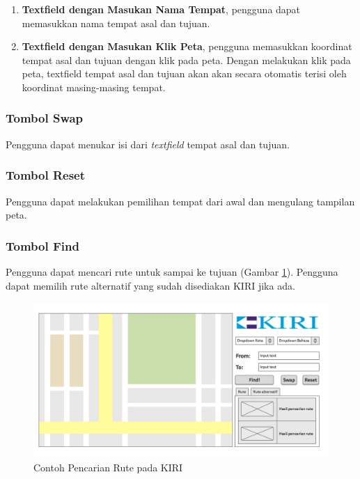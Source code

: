 \begin{enumerate}
	\item \textbf{Textfield dengan Masukan Nama Tempat}, pengguna dapat memasukkan nama tempat asal dan tujuan.
	
	\item \textbf{Textfield dengan Masukan Klik Peta}, pengguna memasukkan koordinat tempat asal dan tujuan dengan klik pada peta. Dengan melakukan klik pada peta, textfield tempat asal dan tujuan akan akan secara otomatis terisi oleh koordinat masing-masing tempat.
	

\end{enumerate}

\subsubsection{Tombol Swap}
Pengguna dapat menukar isi dari \textit{textfield} tempat asal dan tujuan. 

\subsubsection{Tombol Reset}
Pengguna dapat melakukan pemilihan tempat dari awal dan mengulang tampilan peta. 

\subsubsection{Tombol Find}
Pengguna dapat mencari rute untuk sampai ke tujuan (Gambar \ref{fig:4_KIRI_find}). Pengguna dapat memilih rute alternatif yang sudah disediakan KIRI jika ada.

\begin{figure}[H]
	\centering
	\includegraphics[scale=0.3]{Gambar/mockup-findroute}
	\caption{Contoh Pencarian Rute pada KIRI} 
	\label{fig:4_KIRI_find}
\end{figure}
